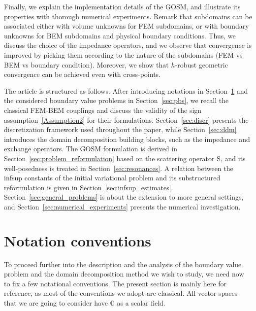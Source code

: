 \documentclass[a4paper,11pt]{article}
\newcommand{\mS}{\mathrm{S}}
\begin{document}
Finally, we explain the implementation details of the GOSM, and illustrate its properties with thorough numerical experiments. Remark that subdomains can be associated either with volume unknowns for FEM subdomains, or with boundary unknowns for BEM subdomains and physical boundary conditions. Thus, we discuss the choice of the impedance operators, and we observe that convergence is improved by picking them according to the nature of the subdomains (FEM vs BEM vs boundary condition). Moreover, we show that \(h\)-robust geometric convergence can be achieved even with cross-points.

The article is structured as follows. After introducing notations in Section~\ref{NotationConventions} and the considered boundary value problems in Section~\ref{sec:pbs}, we recall the classical FEM-BEM couplings and discuss the validity of the sign assumption~\eqref{Assumption2} for their formulations. Section~\ref{sec:discr} presents the discretization framework used throughout the paper, while Section~\ref{sec:ddm} introduces the domain decomposition building blocks, such as the impedance and exchange operators. The GOSM formulation is derived in Section~\ref{sec:problem_reformulation} based on the scattering operator \(\mS\), and its well-posedness is treated in Section~\ref{sec:resonances}. A relation between the infsup constants of the initial variational problem and its substructured reformulation is given in Section~\ref{sec:infsup_estimates}. Section~\ref{sec:general_problems} is about the extension to more general settings, and Section~\ref{sec:numerical_experiments} presents the numerical investigation.

\section{Notation conventions}\label{NotationConventions}

To proceed further into the description and the analysis of the
boundary value problem and the domain decomposition method we wish to
study, we need now to fix a few notational conventions. The present
section is mainly here for reference, as most of the conventions we
adopt are classical. All vector spaces that we are going to consider have $\mathbb{C}$ as a 
scalar field.
\end{document}
